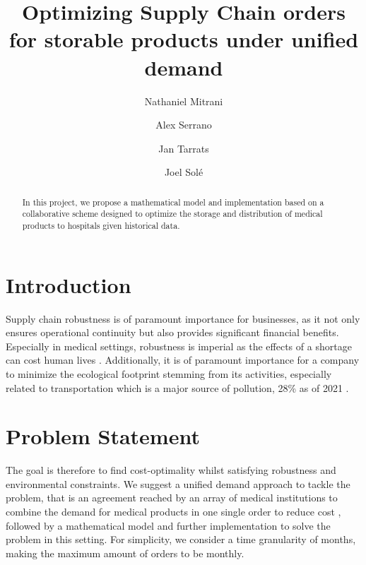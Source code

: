 \documentclass[11pt,twocolumn]{article}
\begin{document}
\title{Optimizing Supply Chain orders for storable products under unified demand}

\author{Nathaniel Mitrani \\ \and Alex Serrano \\  \and Jan Tarrats \\ \and Joel Solé}

\maketitle

\begin{abstract}
In this project, we propose a mathematical model and implementation based on a collaborative scheme designed to optimize the storage and distribution of medical products to hospitals given historical data.
\end{abstract}


\section{Introduction}\label{sec1}
Supply chain robustness is of paramount importance for businesses, as it not only ensures operational continuity but also provides significant financial benefits. Especially in medical settings, robustness is imperial as the effects of a shortage can cost human lives \cite{key3}.
Additionally, it is of paramount importance for a company to minimize the ecological footprint stemming from its activities, especially related to transportation which is a major source of pollution, 28\% as of 2021 \cite{key1}. 

\section{Problem Statement}\label{sec2}
The goal is therefore to find cost-optimality whilst satisfying robustness and environmental constraints. We suggest a unified demand approach to tackle the problem, that is an agreement reached by an array of medical institutions to combine the demand for medical products in one single order to reduce cost \cite{key2}, followed by a mathematical model and further implementation to solve the problem in this setting. For simplicity, we consider a time granularity of months, making the maximum amount of orders to be monthly.
\end{document}
